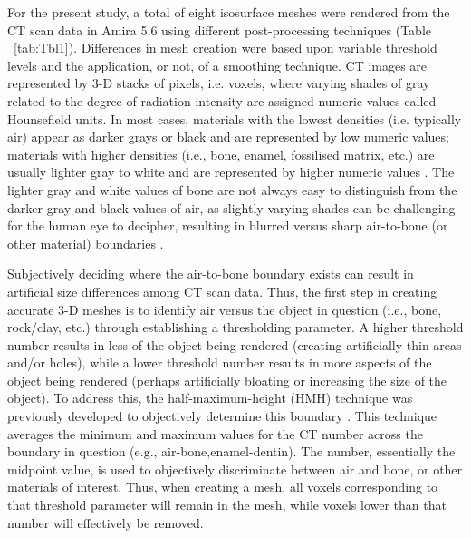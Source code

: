 \documentclass[review]{elsarticle}
\begin{document}
For the present study, a total of eight isosurface meshes were rendered from the CT scan data in Amira 5.6 \citep{RN5898} using different post-processing techniques (Table ~\ref{tab:Tbl1}). Differences in mesh creation were based upon variable threshold levels and the application, or not, of a smoothing technique. CT images are represented by 3-D stacks of pixels, i.e. voxels, where varying shades of gray related to the degree of radiation intensity are assigned numeric values called Hounsefield units. In most cases, materials with the lowest densities (i.e. typically air) appear as darker grays or black and are represented by low numeric values; materials with higher densities (i.e., bone, enamel, fossilised matrix, etc.) are usually lighter gray to white and are represented by higher numeric values \citep{RN11484,RN11482}. The lighter gray and white values of bone are not always easy to distinguish from the darker gray and black values of air, as slightly varying shades can be challenging for the human eye to decipher, resulting in blurred versus sharp air-to-bone (or other material) boundaries \citep{RN11478}. 

Subjectively deciding where the air-to-bone boundary exists can result in artificial size differences among CT scan data. Thus, the first step in creating accurate 3-D meshes is to identify air versus the object in question (i.e., bone, rock/clay, etc.) through establishing a thresholding parameter. A higher threshold number results in less of the object being rendered (creating artificially thin areas and/or holes), while a lower threshold number results in more aspects of the object being rendered (perhaps artificially bloating or increasing the size of the object). To address this, the half-maximum-height (HMH) technique was previously developed to objectively determine this boundary \citep{RN11483,RN11485,RN11486}. This technique averages the minimum and maximum values for the CT number across the boundary in question (e.g., air-bone,enamel-dentin). The number, essentially the midpoint value, is used to objectively discriminate between air and bone, or other materials of interest. Thus, when creating a mesh, all voxels corresponding to that threshold parameter will remain in the mesh, while voxels lower than that number will effectively be removed. 
\end{document}
